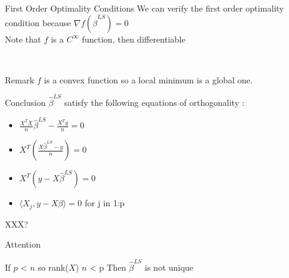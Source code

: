 \documentclass[unknownkeysallowed]{beamer}
\begin{document}
\begin{frame}
\begin{alertblock}{First Order Optimality Conditions}
We can verify the first order optimality condition because $\nabla{f(\hat\beta^{LS})}=0$
\\
Note that $f$ is a $C^{\infty}$ function, then differentiable

\end{alertblock}

\\\begin{block}{Remark}
$f$ is a convex function so a local minimum is a global one.
\end{block}

\begin{block}{Conclusion}
$\hat\beta^{LS}$ satisfy the following equations of orthogonality :
\begin{itemize}
        \item $\frac{X^TX}{n}\hat\beta^{LS}-\frac{X^Ty}{n}=0$
        \item \iff $X^T(\frac{X\hat\beta^{LS}-y}{n})=0$
        \item \iff $X^T(y-X\hat\beta^{LS})=0$
        \item \iff $\langle X_{j},y-X\beta\rangle=0$ for j in 1:p
    \end{itemize}


\end{block}
\end{frame}


\begin{frame}{XXX?} %
\begin{block}{Attention}

If $p$ < $n$ so rank($X$) \leq $n$ < p Then $\hat\beta^{LS}$ is not unique

\end{block}
\end{frame}
\end{document}
